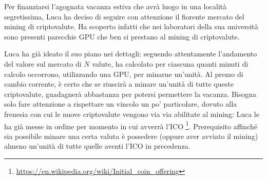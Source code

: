 \usepackage{xcolor}
\usepackage{afterpage}
\usepackage{pifont,mdframed}
\usepackage[bottom]{footmisc}
\usepackage{xfrac}
\hypersetup{colorlinks = true,linkcolor = black,urlcolor  = blue,citecolor = black,anchorcolor = black}

\newcommand{\inputfile}{\texttt{input.txt}}
\newcommand{\outputfile}{\texttt{output.txt}}

\newenvironment{warning}
  {\par\begin{mdframed}[linewidth=2pt,linecolor=gray]%
    \begin{list}{}{\leftmargin=1cm
                   \labelwidth=\leftmargin}\item[\Large\ding{43}]}
  {\end{list}\end{mdframed}\par}

\newcommand{\funcitem}[2]{\item[$\blacksquare$] \textbf{\large \textsf{Funzione} \texttt{#1}} \vspace{-0.3cm} \begin{center}\begin{tabularx}{\textwidth}{|c|X|} \hline #2 \hline \end{tabularx}\end{center}}



    Per finanziarsi l'agognata vacanza estiva che avrà luogo in una località segretissima, Luca ha deciso di seguire con attenzione il fiorente mercato del mining di criptovalute. Ha scoperto infatti che nei laboratori della sua università sono presenti parecchie GPU che ben si prestano al mining di criptovalute.
      
    Luca ha già ideato il suo piano nei dettagli: seguendo attentamente l'andamento del valore sul mercato di $N$ valute, ha calcolato per ciascuna quanti minuti di calcolo occorrono, utilizzando una GPU, per minarne un'unità. Al prezzo di cambio corrente, è certo che se riuscirà a minare un'unità di tutte queste criptovalute, guadagnerà abbastanza per potersi permettere la vacanza. Bisogna solo fare attenzione a rispettare un vincolo un po' particolare, dovuto alla frenesia con cui le nuove criptovalute vengono via via abilitate al mining: Luca le ha già messe in ordine per momento in cui avverrà l'ICO \footnote{\url{https://en.wikipedia.org/wiki/Initial_coin_offering}}. Prerequisito affinché sia possibile minare una certa valuta è possedere (oppure aver avviato il mining) almeno un'unità di tutte quelle aventi l'ICO in precedenza.

